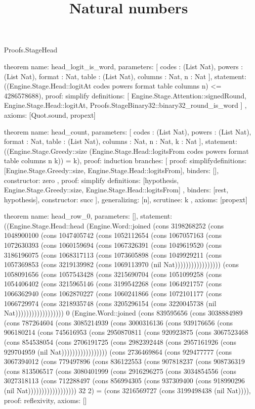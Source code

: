 \begin{lexlean}{Proofs.StageHead}
\title{Natural numbers}
\begin{semanticmodule}
theorem{
  name: head_logit_is_word,
  parameters: [
    codes : (List Nat),
    powers : (List Nat),
    format : Nat,
    table : (List Nat),
    columns : Nat,
    n : Nat
  ],
  statement: ((Engine.Stage.Head::logitAt codes powers format table columns n) <= 4286578688),
  proof: simplify{
    definitions: [
      Engine.Stage.Attention::signedRound,
      Engine.Stage.Head::logitAt,
      Proofs.StageBinary32::binary32_round_is_word
    ]
  },
  axioms: [Quot.sound, propext]
}

theorem{
  name: head_count,
  parameters: [
    codes : (List Nat),
    powers : (List Nat),
    format : Nat,
    table : (List Nat),
    columns : Nat,
    n : Nat,
    k : Nat
  ],
  statement: ((Engine.Stage.Greedy::size (Engine.Stage.Head::logitsFrom codes powers format table columns n k)) = k),
  proof: induction{
    branches: [
      {
        proof: simplify{definitions: [Engine.Stage.Greedy::size, Engine.Stage.Head::logitsFrom]},
        binders: [],
        constructor: zero
      },
      {
        proof: simplify{
          definitions: [hypothesis, Engine.Stage.Greedy::size, Engine.Stage.Head::logitsFrom]
        },
        binders: [rest, hypothesis],
        constructor: succ
      }
    ],
    generalizing: [n],
    scrutinee: k
  },
  axioms: [propext]
}

theorem{
  name: head_row_0,
  parameters: [],
  statement: ((Engine.Stage.Head::head (Engine.Word::joined (cons 3198268252 (cons 1048900100 (cons 1047405742 (cons 1052112654 (cons 1067057163 (cons 1072630393 (cons 1060159694 (cons 1067326391 (cons 1049619520 (cons 3186196075 (cons 1068317113 (cons 1073605898 (cons 1049929211 (cons 1057369853 (cons 3219139982 (cons 1069113970 (nil Nat))))))))))))))))) (cons 1058091656 (cons 1057543428 (cons 3215690704 (cons 1051099258 (cons 1054406402 (cons 3215965146 (cons 3199542268 (cons 1064921757 (cons 1066362940 (cons 1062870227 (cons 1060241866 (cons 1072101177 (cons 1066729974 (cons 3218935748 (cons 3205296154 (cons 3220045738 (nil Nat)))))))))))))))))) 0 (Engine.Word::joined (cons 839595656 (cons 3038884989 (cons 787264604 (cons 3085214939 (cons 3000316136 (cons 939176656 (cons 906180214 (cons 745616953 (cons 2950870811 (cons 920923875 (cons 3067523468 (cons 854538054 (cons 2706191725 (cons 2982392448 (cons 2957161926 (cons 929704959 (nil Nat))))))))))))))))) (cons 2736469864 (cons 929477777 (cons 3067394012 (cons 779497896 (cons 836122553 (cons 907818237 (cons 908736319 (cons 813506517 (cons 3080401999 (cons 2916296275 (cons 3034854556 (cons 3027318113 (cons 712288497 (cons 856994305 (cons 937309400 (cons 918990296 (nil Nat)))))))))))))))))) 32 2) = (cons 3216569727 (cons 3199498438 (nil Nat)))),
  proof: reflexivity{},
  axioms: []
}


\end{semanticmodule}
\end{lexlean}
